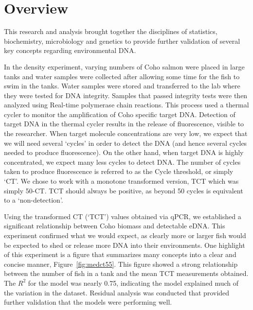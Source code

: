 
\label{chapter:Conclusions}

\section{Overview}

This research and analysis brought together the disciplines of statistics, biochemistry, microbiology and genetics to provide further validation of several key concepts regarding environmental DNA.  


\vspace{5mm}
In the density experiment, varying numbers of Coho salmon were placed in large tanks and water samples were collected after allowing some time for the fish to swim in the tanks. Water samples were stored and transferred to the lab where they were tested for DNA integrity. Samples that passed integrity tests were then analyzed using Real-time polymerase chain reactions. This process used a thermal cycler to monitor the amplification of  Coho specific target DNA. Detection of target DNA in the thermal cycler results in the release of fluorescence, visible to the researcher. When target molecule concentrations are very low, we expect that we will need several `cycles' in order to detect the DNA (and hence several cycles needed to produce fluorescence). On the other hand, when target DNA is highly concentrated, we expect many less cycles to detect DNA. The number of cycles taken to produce fluorescence is referred to as the Cycle threshold, or simply `CT'. We chose to work with a monotone transformed version, TCT which was simply 50-CT. TCT should always be positive, as beyond 50 cycles is equivalent to a `non-detection'.

\vspace{5mm}
Using the transformed CT (`TCT') values obtained via qPCR, we established a significant relationship between Coho biomass and detectable eDNA. This experiment confirmed what we would expect, as clearly more or larger fish would be expected to shed or release more DNA into their environments. One highlight of this experiment is a figure that summarizes many concepts into a clear and concise manner, Figure~\ref{fig:medct55}. This figure showed a strong relationship between the number of fish in a tank and the mean TCT measurements obtained. The $R^{2}$ for the model was nearly 0.75, indicating the model explained much of the variation in the dataset. Residual analysis was conducted that provided further validation that the models were performing well.

